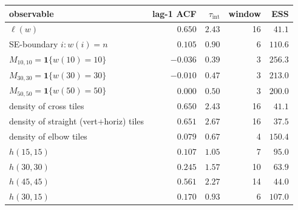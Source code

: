 \begin{tabular}{lrrrr}
\hline
observable & lag-1 ACF & $\tau_{\mathrm{int}}$ & window & ESS \\
\hline
$\ell(w)$                                          & $0.650$  & $2.43$ & 16 & $41.1$  \\
SE-boundary $i\colon w(i)=n$                       & $0.105$  & $0.90$ & 6  & $110.6$ \\
$M_{10,10} = \mathbf{1}\{w(10)=10\}$               & $-0.036$ & $0.39$ & 3  & $256.3$ \\
$M_{30,30} = \mathbf{1}\{w(30)=30\}$               & $-0.010$ & $0.47$ & 3  & $213.0$ \\
$M_{50,50} = \mathbf{1}\{w(50)=50\}$               & $0.000$  & $0.50$ & 3  & $200.0$ \\
density of cross tiles                              & $0.650$  & $2.43$ & 16 & $41.1$  \\
density of straight (vert+horiz) tiles              & $0.651$  & $2.67$ & 16 & $37.5$  \\
density of elbow tiles                              & $0.079$  & $0.67$ & 4  & $150.4$ \\
$h(15,15)$                                          & $0.107$  & $1.05$ & 7  & $95.0$  \\
$h(30,30)$                                          & $0.245$  & $1.57$ & 10 & $63.9$  \\
$h(45,45)$                                          & $0.561$  & $2.27$ & 14 & $44.0$  \\
$h(30,15)$                                          & $0.170$  & $0.93$ & 6  & $107.0$ \\
\hline
\end{tabular}
